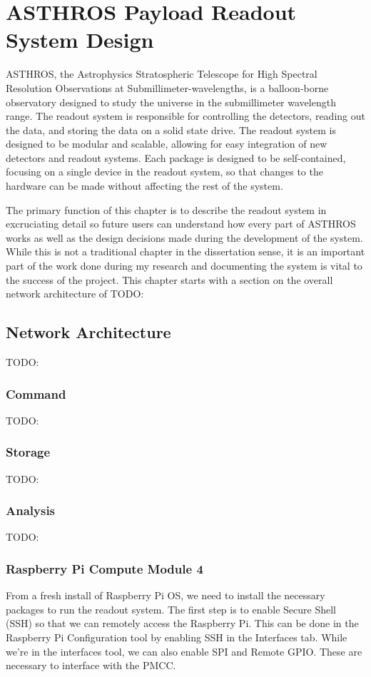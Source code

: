 \chapter[ASTHROS Payload Readout System Design]{ASTHROS Payload Readout System Design}
ASTHROS, the Astrophysics Stratospheric Telescope for High Spectral Resolution Observations at Submillimeter-wavelengths, is a balloon-borne observatory designed to study the universe in the submillimeter wavelength range.
The readout system is responsible for controlling the detectors, reading out the data, and storing the data on a solid state drive.
The readout system is designed to be modular and scalable, allowing for easy integration of new detectors and readout systems.
Each package is designed to be self-contained, focusing on a single device in the readout system, so that changes to the hardware can be made without affecting the rest of the system.

The primary function of this chapter is to describe the readout system in excruciating detail so future users can understand how every part of ASTHROS works as well as the design decisions made during the development of the system.
While this is not a traditional chapter in the dissertation sense, it is an important part of the work done during my research and documenting the system is vital to the success of the project.
This chapter starts with a section on the overall network architecture of 
TODO:
\section{Network Architecture}
TODO:
\subsection{Command}
TODO:
\subsection{Storage}
TODO:
\subsection{Analysis}
TODO:
\subsection{Raspberry Pi Compute Module 4}
From a fresh install of Raspberry Pi OS, we need to install the necessary packages to run the readout system.
The first step is to enable Secure Shell (SSH) so that we can remotely access the Raspberry Pi.
This can be done in the Raspberry Pi Configuration tool by enabling SSH in the Interfaces tab.
While we're in the interfaces tool, we can also enable SPI and Remote GPIO. 
These are necessary to interface with the PMCC.

